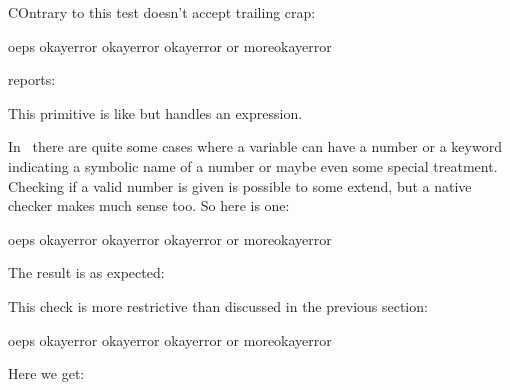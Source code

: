 \stopnewprimitive

\startnewprimitive[title={\prm {ifchkdimension}}]

COntrary to  this test doesn't accept trailing crap:

\startbuffer
\ifchkdimension oeps        \or okay\else error\fi\quad
{}          \or okay\else error\fi\quad
\ifchkdimension 12pt        \or okay\else error\fi\quad
\ifchkdimension 12pt or more\or okay\else error\fi
\stopbuffer

\typebuffer

reports:

{\getbuffer}

\stopnewprimitive

\startnewprimitive[title={\prm {ifchkdimexpr}}]

This primitive is like  but handles an expression.

\stopnewprimitive

\startnewprimitive[title={\prm {ifchknum}}]

In \CONTEXT\ there are quite some cases where a variable can have a number or a
keyword indicating a symbolic name of a number or maybe even some special
treatment. Checking if a valid number is given is possible to some extend, but a
native checker makes much sense too. So here is one:

\startbuffer
\ifchknum oeps        \or okay\else error\fi\quad
{}          \or okay\else error\fi\quad
\ifchknum 12pt        \or okay\else error\fi\quad
\ifchknum 12pt or more\or okay\else error\fi
\stopbuffer

\typebuffer

The result is as expected:

{\getbuffer}

\stopnewprimitive

\startnewprimitive[title={\prm {ifchknumber}}]

This check is more restrictive than  discussed in the previous
section:

\startbuffer
\ifchknumber oeps        \or okay\else error\fi\quad
{}          \or okay\else error\fi\quad
\ifchknumber 12pt        \or okay\else error\fi\quad
\ifchknumber 12pt or more\or okay\else error\fi
\stopbuffer

\typebuffer

Here we get:

{\getbuffer}

\stopnewprimitive


